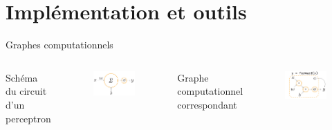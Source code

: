 \documentclass[12pt,dvipsnames,aspectratio=169]{beamer}
\begin{document}
\section{Implémentation et outils}

\begin{frame}{Graphes computationnels}

\begin{columns}


    Schéma du circuit d'un perceptron
    
    \begin{figure}
        \centering
        \includegraphics[width=\textwidth]{figures/nocompgraph.pdf}
    \end{figure}
        

    Graphe computationnel correspondant

    \begin{figure}
        \centering
        \includegraphics[width=\textwidth]{figures/compgraph.pdf}
    \end{figure}
    
\end{columns}

\end{frame}
\end{document}
